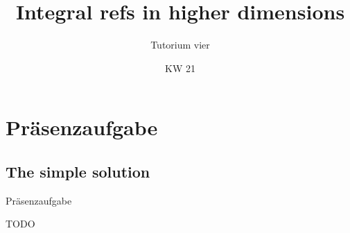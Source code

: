 \relax\relax

\iffull
\title{Integral refs in higher dimensions}
\subtitle{Tutorium vier}
\date{KW 21}

\fi
{}

\iffull
\titleframe

\fi

\fi

\SetNextSectionText[.55\linewidth]{}
\section{Präsenzaufgabe}
\subsection{The simple solution}
\begin{frame}[c]{Präsenzaufgabe}
\begin{aufgabe}{TODO}
\end{aufgabe}
\end{frame}



\iffull\fi
